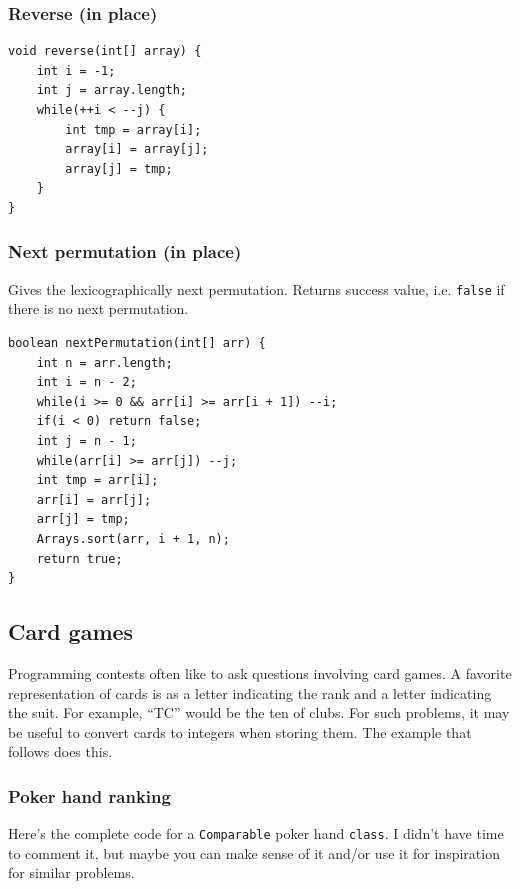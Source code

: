\documentclass[a4paper,12pt]{article}
\begin{document}
\subsubsection{Reverse (in place)}
\begin{lstlisting}
void reverse(int[] array) {
	int i = -1;
	int j = array.length;
	while(++i < --j) {
		int tmp = array[i];
		array[i] = array[j];
		array[j] = tmp;
	}
}
\end{lstlisting}

\subsubsection{Next permutation (in place)}
Gives the lexicographically next permutation. Returns success value, i.e. \lstinline/false/ if there is no next permutation.
\begin{lstlisting}
boolean nextPermutation(int[] arr) {
	int n = arr.length;
	int i = n - 2;
	while(i >= 0 && arr[i] >= arr[i + 1]) --i;
	if(i < 0) return false;
	int j = n - 1;
	while(arr[i] >= arr[j]) --j;
	int tmp = arr[i];
	arr[i] = arr[j];
	arr[j] = tmp;
	Arrays.sort(arr, i + 1, n);
	return true;
}
\end{lstlisting}

\subsection{Card games}
Programming contests often like to ask questions involving card games. A favorite representation of cards is as a letter indicating the rank and a letter indicating the suit. For example, ``TC'' would be the ten of clubs. For such problems, it may be useful to convert cards to integers when storing them. The example that follows does this.

\subsubsection{Poker hand ranking}
\noindent Here's the complete code for a \lstinline/Comparable/ poker hand \lstinline/class/. I didn't have time to comment it, but maybe you can make sense of it and/or use it for inspiration for similar problems.
\end{document}
